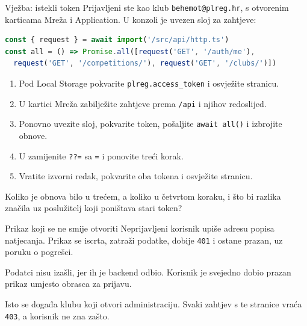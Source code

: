 \begin{frame}[fragile]{Vježba: istekli token}
Prijavljeni ste kao klub \texttt{behemot@plreg.hr}, s otvorenim karticama Mreža i Application. U konzoli je uvezen sloj za zahtjeve:

\begin{lstlisting}[language=typescript]
const { request } = await import('/src/api/http.ts')
const all = () => Promise.all([request('GET', '/auth/me'),
  request('GET', '/competitions/'), request('GET', '/clubs/')])
\end{lstlisting}

\begin{enumerate}
  \itemsep0.15em
  \item Pod Local Storage pokvarite \texttt{plreg.access\_token} i osvježite stranicu.
  \item U kartici Mreža zabilježite zahtjeve prema \texttt{/api} i njihov redoslijed.
  \item Ponovno uvezite sloj, pokvarite token, pošaljite \texttt{await all()} i izbrojite obnove.
  \item U  zamijenite \texttt{??=} sa \texttt{=} i ponovite treći korak.
  \item Vratite izvorni redak, pokvarite oba tokena i osvježite stranicu.
\end{enumerate}

\vspace{0.2em}
Koliko je obnova bilo u trećem, a koliko u četvrtom koraku, i što bi razlika značila uz poslužitelj koji poništava stari token?
\end{frame}


\begin{frame}{Prikaz koji se ne smije otvoriti}
Neprijavljeni korisnik upiše adresu popisa natjecanja. Prikaz se iscrta, zatraži podatke, dobije \texttt{401} i ostane prazan, uz poruku o pogrešci.

\vspace{0.9em}
Podatci nisu izašli, jer ih je backend odbio. Korisnik je svejedno dobio prazan prikaz umjesto obrasca za prijavu.

\vspace{0.9em}
Isto se događa klubu koji otvori administraciju. Svaki zahtjev s te stranice vraća \texttt{403}, a korisnik ne zna zašto.
\end{frame}

